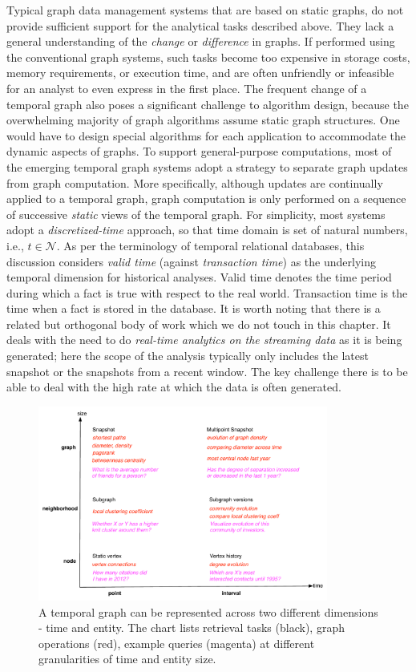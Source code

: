 \documentclass{svjour3}
\begin{document}
Typical graph data management systems that are based on static graphs, do not provide sufficient support for the analytical tasks described above. They lack a general understanding of the {\em change} or {\em difference} in graphs. If performed using the conventional graph systems, such tasks become too expensive in storage costs, memory requirements, or execution time, and are often unfriendly or infeasible for an analyst to even express in the first place. 
The frequent change of a temporal graph also poses a significant challenge to algorithm design, because the overwhelming majority of graph algorithms assume static graph structures. One would have to design special algorithms for each application to accommodate the dynamic aspects of graphs. To support general-purpose computations, most of the emerging temporal graph systems adopt a strategy to separate graph updates from graph computation. More specifically, although updates are continually applied to a temporal graph, graph computation is only performed on a sequence of successive \emph{static} views of the temporal graph. For simplicity, most systems adopt a \emph{discretized-time} approach, so that time domain is set of natural numbers, i.e., $t\in \mathcal{N}$. 
As per the terminology of temporal relational databases, this discussion considers {\em valid time} (against {\em transaction time}) as the underlying temporal dimension for historical analyses. Valid time denotes the time
period during which a fact is true with respect to the real world. Transaction time is the time
when a fact is stored in the database. 
It is worth noting that there is a related but orthogonal body of work which we do not touch in this chapter. It deals with the need to do {\em real-time analytics on the streaming data} as it is being generated; here the scope of the analysis typically only includes the latest snapshot or the snapshots from a recent window. The key challenge there is to be able to deal with the high rate at which the data is often generated.

\begin{figure}
\centering
\includegraphics [width=0.85\textwidth]{entity-time.pdf}
\caption{A temporal graph can be represented across two different dimensions - time
and entity. The chart lists retrieval tasks (black), graph operations (red), example queries
(magenta) at different granularities of time and entity size.}
\label{fig:et}
\end{figure}
\end{document}
